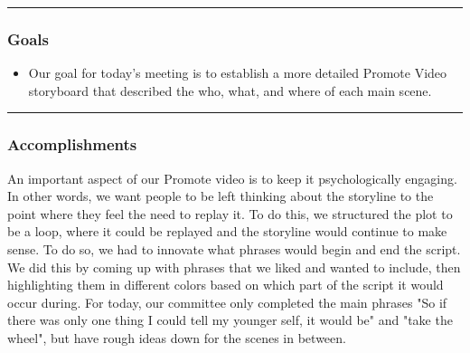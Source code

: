 \noindent\hfil\rule{\textwidth}{.4pt}\hfil
\subsubsection*{Goals}
\begin{itemize}
    \item Our goal for today's meeting is to establish a more detailed Promote Video storyboard that described the who, what, and where of each main scene. 

\end{itemize} 

\noindent\hfil\rule{\textwidth}{.4pt}\hfil

\subsubsection*{Accomplishments}An important aspect of our Promote video is to keep it psychologically engaging. In other words, we want people to be left thinking about the storyline to the point where they feel the need to replay it. To do this, we structured the plot to be a loop, where it could be replayed and the storyline would continue to make sense. To do so, we had to innovate what phrases would begin and end the script. We did this by coming up with phrases that we liked and wanted to include, then highlighting them in different colors based on which part of the script it would occur during. For today, our committee only completed the main phrases "So if there was only one thing I could tell my younger self, it would be" and "take the wheel", but have rough ideas down for the scenes in between.
 



